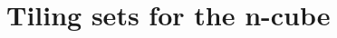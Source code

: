 \documentclass[../thesis.tex]{subfiles}
\begin{document}
\section{Tiling sets for the n-cube}












\end{document}
